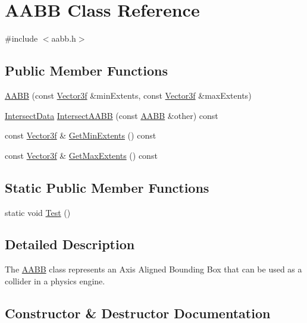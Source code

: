 \hypertarget{class_a_a_b_b}{}\section{A\+A\+B\+B Class Reference}
\label{class_a_a_b_b}


{\ttfamily \#include $<$aabb.\+h$>$}

\subsection*{Public Member Functions}
\begin{DoxyCompactItemize}
\item 
\hyperlink{class_a_a_b_b_a8d02c9a2bdd8a46125fc8209b1aa4518}{A\+A\+B\+B} (const \hyperlink{class_vector3f}{Vector3f} \&min\+Extents, const \hyperlink{class_vector3f}{Vector3f} \&max\+Extents)
\item 
\hyperlink{class_intersect_data}{Intersect\+Data} \hyperlink{class_a_a_b_b_ac813b88bd2fc7eaa2410cc9f227d8b7f}{Intersect\+A\+A\+B\+B} (const \hyperlink{class_a_a_b_b}{A\+A\+B\+B} \&other) const 
\item 
const \hyperlink{class_vector3f}{Vector3f} \& \hyperlink{class_a_a_b_b_a01c73769173c70809683dda9a5e96a4f}{Get\+Min\+Extents} () const 
\item 
const \hyperlink{class_vector3f}{Vector3f} \& \hyperlink{class_a_a_b_b_a6ae2bfff769bee5c66d6f59bcfc00829}{Get\+Max\+Extents} () const 
\end{DoxyCompactItemize}
\subsection*{Static Public Member Functions}
\begin{DoxyCompactItemize}
\item 
static void \hyperlink{class_a_a_b_b_a846b829dbe39041ef31723da4d3b9002}{Test} ()
\end{DoxyCompactItemize}


\subsection{Detailed Description}
The \hyperlink{class_a_a_b_b}{A\+A\+B\+B} class represents an Axis Aligned Bounding Box that can be used as a collider in a physics engine. 

\subsection{Constructor \& Destructor Documentation}
\hypertarget{class_a_a_b_b_a8d02c9a2bdd8a46125fc8209b1aa4518}{}
